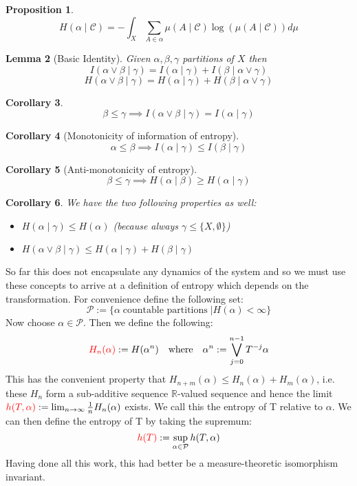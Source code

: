 \documentclass[11pt]{article}
\newcommand{\defeq}{:=}
\newcommand{\R}{\mathbb{R}}
\newcommand{\gvn}[2]{\ensuremath{\left(#1\;|\;#2\right)}}
\newcommand{\infog}[2]{\ensuremath{I\gvn{#1}{#2}}}
\newcommand{\entrg}[2]{\ensuremath{H\gvn{#1}{#2}}}
\newcommand{\mdf}[1]{{\color{red} #1}}
\newtheorem{prop}{Proposition}[section]
\newtheorem{lemma}[prop]{Lemma}
\newtheorem{cor}[prop]{Corollary}
\begin{document}
\begin{prop}
	$$\entrg{\alpha}{\mathcal{C}}=-\int_X \sum_{A\in\alpha}\mu\gvn{A}{\mathcal{C}}\log(\mu\gvn{A}{\mathcal{C}})d\mu$$	
\end{prop}
\begin{lemma}[Basic Identity]
	Given $\alpha,\beta,\gamma$ partitions of $X$ then
	$$\infog{\alpha\vee\beta}{\gamma}=\infog{\alpha}{\gamma}+\infog{\beta}{\alpha\vee\gamma}$$
	$$\entrg{\alpha\vee\beta}{\gamma}=\entrg{\alpha}{\gamma}+\entrg{\beta}{\alpha\vee\gamma}$$
\end{lemma}
\begin{cor}
	$$\beta\leq\gamma\implies\infog{\alpha\vee\beta}{\gamma}=\infog{\alpha}{\gamma}$$
\end{cor}
\begin{cor}[Monotonicity of information of entropy]
	$$\alpha\leq\beta\implies\infog{\alpha}{\gamma}\leq\infog{\beta}{\gamma}$$
\end{cor}
\begin{cor}[Anti-monotonicity of entropy]
	$$\beta\leq\gamma\implies\entrg{\alpha}{\beta}\geq\entrg{\alpha}{\gamma}$$
\end{cor}
\begin{cor}
We have the two following properties as well:
\begin{itemize}
	\item $\entrg{\alpha}{\gamma}\leq H(\alpha)$ (because always $\gamma\leq\{X,\emptyset\}$)
	\item $\entrg{\alpha\vee\beta}{\gamma}\leq\entrg{\alpha}{\gamma}+\entrg{\beta}{\gamma}$
\end{itemize}
\end{cor}
So far this does not encapsulate any dynamics of the system and so we must use these concepts to arrive at a definition of entropy which depends on the transformation. For convenience define the following set:
$$\mathcal{P}\defeq\{\alpha\;\text{countable partitions}\;|H(\alpha) < \infty\}$$
Now choose $\alpha\in\mathcal{P}$. Then we define the following:
$$\mdf{H_n(\alpha)}\defeq H(\alpha^n)\quad\text{where}\quad\alpha^n\defeq\bigvee_{j=0}^{n-1}T^{-j}\alpha$$
This has the convenient property that $H_{n+m}(\alpha)\leq H_n(\alpha)+H_m(\alpha)$, i.e. these $H_n$ form a sub-additive sequence $\R$-valued sequence and hence the limit $\mdf{h(T,\alpha)}\defeq\lim_{n\to\infty}\frac{1}{n}H_n(\alpha)$ exists. We call this the \mdf{entropy of T relative to $\alpha$}.
We can then define the \mdf{entropy of T} by taking the supremum:
$$\mdf{h(T)}\defeq\sup_{\alpha\in\mathcal{P}}h(T,\alpha)$$
Having done all this work, this had better be a measure-theoretic isomorphism invariant.
\end{document}

